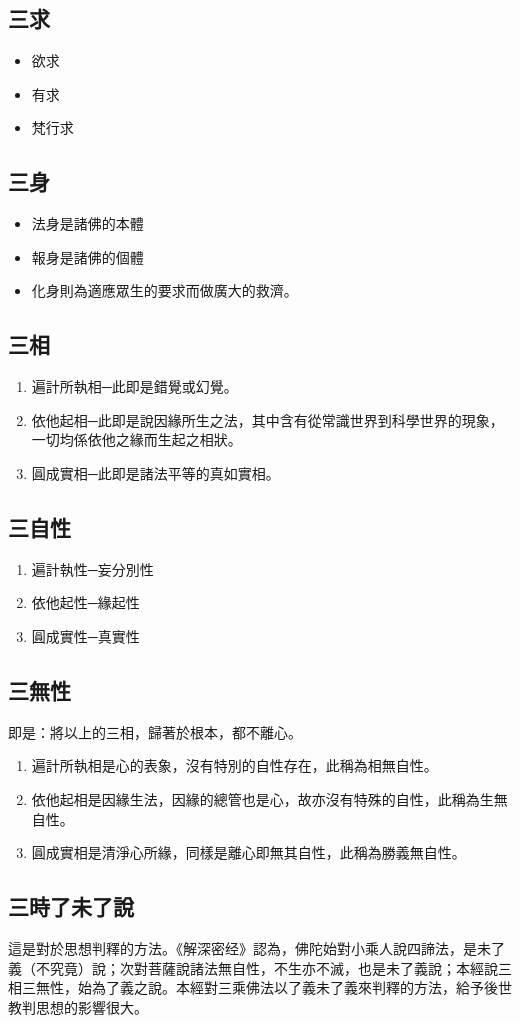 \subsection{三求}
\begin{itemize}
  \item 欲求  \item 有求  \item 梵行求
\end{itemize}

\subsection{三身}
\begin{itemize}
  \item 法身是諸佛的本體
  \item 報身是諸佛的個體
  \item 化身則為適應眾生的要求而做廣大的救濟。
\end{itemize}


\subsection{三相}
\begin{enumerate}
  \item 遍計所執相─此即是錯覺或幻覺。
  \item 依他起相─此即是說因緣所生之法，其中含有從常識世界到科學世界的現象，一切均係依他之緣而生起之相狀。
  \item 圓成實相─此即是諸法平等的真如實相。
\end{enumerate}
\subsection{三自性}
\begin{enumerate}
  \item 遍計執性─妄分別性
  \item 依他起性─緣起性
  \item 圓成實性─真實性
\end{enumerate}
\subsection{三無性}
即是：將以上的三相，歸著於根本，都不離心。
\begin{enumerate}
  \item 遍計所執相是心的表象，沒有特別的自性存在，此稱為相無自性。
  \item 依他起相是因緣生法，因緣的總管也是心，故亦沒有特殊的自性，此稱為生無自性。
  \item 圓成實相是清淨心所緣，同樣是離心即無其自性，此稱為勝義無自性。
\end{enumerate}
\subsection{三時了未了說}
這是對於思想判釋的方法。《解深密经》認為，佛陀始對小乘人說四諦法，是未了義（不究竟）說；次對菩薩說諸法無自性，不生亦不滅，也是未了義說；本經說三相三無性，始為了義之說。本經對三乘佛法以了義未了義來判釋的方法，給予後世教判思想的影響很大。
